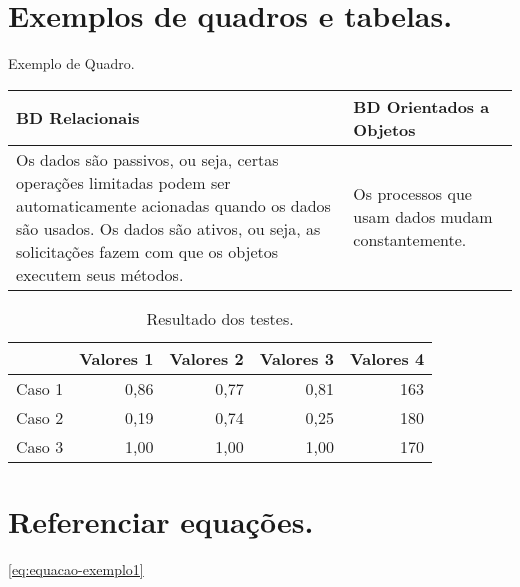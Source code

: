 \verb||

\verb||

\section{Exemplos de quadros e tabelas.}

\begin{quadro}[H]
    \centering
    \caption{Exemplo de Quadro.\label{qua:quadro-exemplo1}}
    \begin{tabular}{|p{7cm}|p{7cm}|}
        \hline
        \textbf{BD Relacionais} & \textbf{BD Orientados a Objetos} \\
        \hline
        Os dados são passivos, ou seja, certas operações limitadas podem ser automaticamente acionadas quando os dados são usados. Os dados são ativos, ou seja, as solicitações fazem com que os objetos executem seus métodos. & Os processos que usam dados mudam constantemente. \\
        \hline
    \end{tabular}
\end{quadro}

\begin{table}[!htb]
    \centering
    \caption[Resultado dos testes]{Resultado dos testes.
    \label{tab:tabela-exemplo1}}
    \begin{tabular}{rrrrr}
        \toprule
            & Valores 1 & Valores 2 & Valores 3 & Valores 4 \\
        \midrule
            Caso 1 & 0,86 & 0,77 & 0,81 & 163 \\
            Caso 2 & 0,19 & 0,74 & 0,25 & 180 \\
            Caso 3 & 1,00 & 1,00 & 1,00 & 170 \\
        \bottomrule
    \end{tabular}
\end{table}



\section{Referenciar equações.}

\autoref{eq:equacao-exemplo1}

